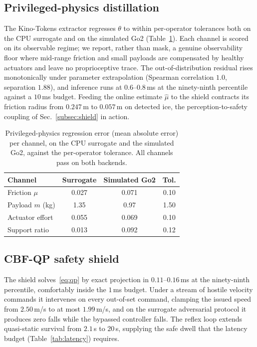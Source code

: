 \documentclass[conference]{IEEEtran}
\newcommand{\kinotokens}{Kino-Tokens}
\begin{document}
\subsection{Privileged-physics distillation}
The \kinotokens{} extractor regresses $\theta$ to within per-operator tolerances
both on the CPU surrogate and on the simulated Go2 (Table~\ref{tab:theta}). Each
channel is scored on its observable regime; we report, rather than mask, a genuine
observability floor where mid-range friction and small payloads are compensated by
healthy actuators and leave no proprioceptive trace. The out-of-distribution
residual rises monotonically under parameter extrapolation (Spearman correlation
$1.0$, separation $1.88$), and inference runs at $0.6$--$0.8$\,ms at the
ninety-ninth percentile against a $10$\,ms budget. Feeding the online estimate
$\hat\mu$ to the shield contracts its friction radius from $0.247$\,m to
$0.057$\,m on detected ice, the perception-to-safety coupling of
Sec.~\ref{subsec:shield} in action.

\begin{table}[t]
\centering
\caption{Privileged-physics regression error (mean absolute error) per channel, on
the CPU surrogate and the simulated Go2, against the per-operator tolerance. All
channels pass on both backends.}
\label{tab:theta}
\begin{tabular}{lccc}
\toprule
Channel & Surrogate & Simulated Go2 & Tol. \\
\midrule
Friction $\mu$        & 0.027 & 0.071 & 0.10 \\
Payload $m$ (kg)      & 1.35  & 0.97  & 1.50 \\
Actuator effort       & 0.055 & 0.069 & 0.10 \\
Support ratio         & 0.013 & 0.092 & 0.12 \\
\bottomrule
\end{tabular}
\end{table}

\subsection{CBF-QP safety shield}
The shield solves~\eqref{eq:qp} by exact projection in $0.11$--$0.16$\,ms at the
ninety-ninth percentile, comfortably inside the $1$\,ms budget. Under a stream of
hostile velocity commands it intervenes on every out-of-set command, clamping the
issued speed from $2.50$\,m/s to at most $1.99$\,m/s, and on the surrogate
adversarial protocol it produces zero falls while the bypassed controller falls.
The reflex loop extends quasi-static survival from $2.1$\,s to $20$\,s, supplying
the safe dwell that the latency budget (Table~\ref{tab:latency}) requires.
\end{document}
